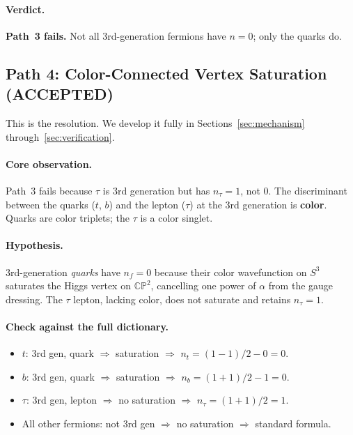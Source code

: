 \documentclass[11pt,a4paper]{article}
\newcommand{\CP}{\mathbb{CP}}
\theoremstyle{definition}
\theoremstyle{remark}
\begin{document}
\paragraph{Verdict.}  \textbf{Path~3 fails.}  Not all 3rd-generation
fermions have $n = 0$; only the quarks do.

\subsection{Path 4: Color-Connected Vertex Saturation (ACCEPTED)}
\label{sec:path4}

This is the resolution.  We develop it fully in Sections~\ref{sec:mechanism}
through~\ref{sec:verification}.

\paragraph{Core observation.}  Path~3 fails because $\tau$ is 3rd generation
but has $n_\tau = 1$, not 0.  The discriminant between the quarks ($t$, $b$)
and the lepton ($\tau$) at the 3rd generation is \textbf{color}.  Quarks are
color triplets; the $\tau$ is a color singlet.

\paragraph{Hypothesis.}  3rd-generation \emph{quarks} have $n_f = 0$ because
their color wavefunction on $S^3$ saturates the Higgs vertex on $\CP^2$,
cancelling one power of $\alpha$ from the gauge dressing.  The
$\tau$ lepton, lacking color, does not saturate and retains $n_\tau = 1$.

\paragraph{Check against the full dictionary.}
\begin{itemize}
\item $t$: 3rd gen, quark $\Rightarrow$ saturation $\Rightarrow$
  $n_t = (1-1)/2 - 0 = 0$.  \checkmark
\item $b$: 3rd gen, quark $\Rightarrow$ saturation $\Rightarrow$
  $n_b = (1+1)/2 - 1 = 0$.  \checkmark
\item $\tau$: 3rd gen, lepton $\Rightarrow$ no saturation $\Rightarrow$
  $n_\tau = (1+1)/2 = 1$.  \checkmark
\item All other fermions: not 3rd gen $\Rightarrow$ no saturation $\Rightarrow$
  standard formula.  \checkmark
\end{itemize}
\end{document}

